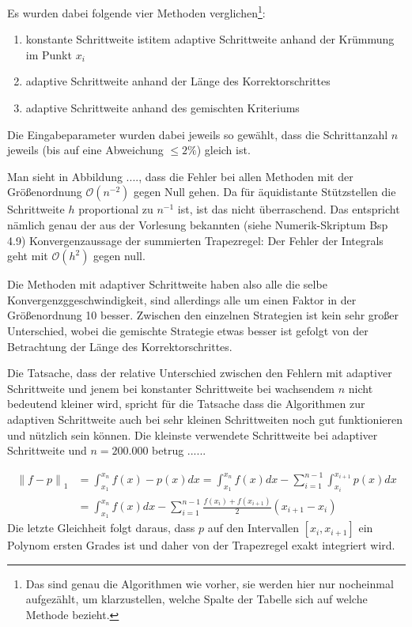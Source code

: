 \documentclass[a4paper,11pt,bibliography=totoc,listof=totoc,headinclude=true,cleardoublepage=empty,oneside]{scrartcl}
\newcommand{\norm}[2]{\left\| #1 \right\|_{#2}}
\begin{document}
Es wurden dabei folgende vier Methoden verglichen\footnote{Das sind genau die Algorithmen wie vorher, sie werden hier nur nocheinmal aufgezählt, um klarzustellen, welche Spalte der Tabelle sich auf welche Methode bezieht.}:
\begin{enumerate}
	\item konstante Schrittweite                                                                                                                                                                                                                                                                                                              istitem adaptive Schrittweite anhand der Krümmung im Punkt $x_i$
	\item adaptive Schrittweite anhand der Länge des Korrektorschrittes
	\item adaptive Schrittweite anhand des gemischten Kriteriums
\end{enumerate}
Die Eingabeparameter wurden dabei jeweils so gewählt, dass die Schrittanzahl $n$ jeweils (bis auf eine Abweichung $\le 2\%$) gleich ist.

Man sieht in Abbildung ...., dass die Fehler bei allen Methoden mit der Größenordnung $\mathcal{O}(n^{-2})$ gegen Null gehen. Da für äquidistante Stützstellen die Schrittweite $h$ proportional zu $n^{-1}$ ist, ist das nicht überraschend. Das entspricht nämlich genau der aus der Vorlesung bekannten (siehe Numerik-Skriptum Bsp 4.9) Konvergenzaussage der summierten Trapezregel: Der Fehler der Integrals geht mit $\mathcal{O}(h^2)$ gegen null.

Die Methoden mit adaptiver Schrittweite haben also alle die selbe Konvergenzggeschwindigkeit, sind allerdings alle um einen Faktor in der Größenordnung 10 besser. Zwischen den einzelnen Strategien ist kein sehr großer Unterschied, wobei die gemischte Strategie etwas besser ist gefolgt von der Betrachtung der Länge des Korrektorschrittes. 

Die Tatsache, dass der relative Unterschied zwischen den Fehlern mit adaptiver Schrittweite und jenem bei konstanter Schrittweite bei wachsendem $n$ nicht bedeutend kleiner wird, spricht für die Tatsache dass die Algorithmen zur adaptiven Schrittweite auch bei sehr kleinen Schrittweiten noch gut funktionieren und nützlich sein können. Die kleinste verwendete Schrittweite bei adaptiver Schrittweite und $n=200.000$ betrug ......

\begin{align*}
\norm{f-p}{1} &= \int_{x_1}^{x_n}\!\! f(x)-p(x) dx = \int_{x_1}^{x_n}\!\! f(x) dx - \sum_{i=1}^{n-1} \int_{x_i}^{x_{i+1}}\!\! p(x) dx \\
&=  \int_{x_1}^{x_n}\!\! f(x) dx - \sum_{i=1}^{n-1} \frac{f(x_{i})+f(x_{i+1})}{2} (x_{i+1}-x_i)
\end{align*}
Die letzte Gleichheit folgt daraus, dass $p$ auf den Intervallen $[x_i,x_{i+1}]$ ein Polynom ersten Grades ist und daher von der Trapezregel exakt integriert wird. 
\end{document}

